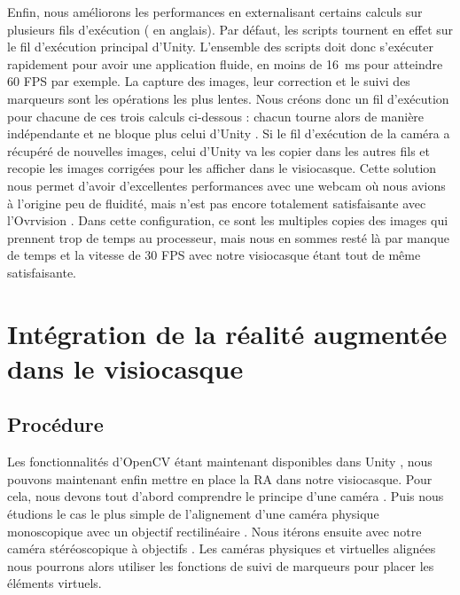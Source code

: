 Enfin, nous améliorons les performances en externalisant certains calculs sur plusieurs fils d'exécution ( en anglais). Par défaut, les scripts tournent en effet sur le fil d'exécution principal d'Unity. L'ensemble des scripts doit donc s'exécuter rapidement pour avoir une application fluide, en moins de \SI{16}{\ms} pour atteindre 60 FPS par exemple. La capture des images, leur correction et le suivi des marqueurs sont les opérations les plus lentes. Nous créons donc un fil d'exécution pour chacune de ces trois calculs ci-dessous : chacun tourne alors de manière indépendante et ne bloque plus celui d'Unity . Si le fil d'exécution de la caméra a récupéré de nouvelles images, celui d'Unity va les copier dans les autres fils et recopie les images corrigées pour les afficher dans le visiocasque. Cette solution nous permet d'avoir d'excellentes performances avec une webcam où nous avions à l'origine peu de fluidité, mais n'est pas encore totalement satisfaisante avec l'Ovrvision . Dans cette configuration, ce sont les multiples copies des images qui prennent trop de temps au processeur, mais nous en sommes resté là par manque de temps et la vitesse de 30 FPS avec notre visiocasque étant tout de même satisfaisante.


\section{Intégration de la réalité augmentée dans le visiocasque}
\label{sec:ar_hmd}

\subsection{Procédure}
\label{subsec:ar_hmd_procedure}
Les fonctionnalités d'OpenCV étant maintenant disponibles dans Unity , nous pouvons maintenant enfin mettre en place la RA dans notre visiocasque. Pour cela, nous devons tout d'abord comprendre le principe d'une caméra . Puis nous étudions le cas le plus simple de l'alignement d'une caméra physique monoscopique avec un objectif rectilinéaire . Nous itérons ensuite avec notre caméra stéréoscopique à objectifs  . Les caméras physiques et virtuelles alignées nous pourrons alors utiliser les fonctions de suivi de marqueurs pour placer les éléments virtuels.

